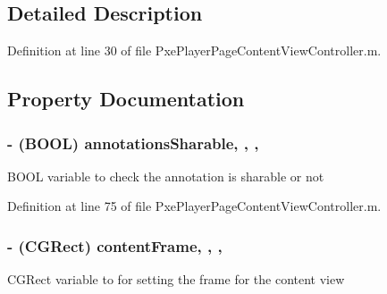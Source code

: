 \subsection{Detailed Description}


Definition at line 30 of file Pxe\-Player\-Page\-Content\-View\-Controller.\-m.



\subsection{Property Documentation}
\hypertarget{category_pxe_player_page_content_view_controller_07_08_aed72d78725a3cab4c50c195b60681fa0}{
\subsubsection[{annotations\-Sharable}]{\setlength{\rightskip}{0pt plus 5cm}-\/ (B\-O\-O\-L) annotations\-Sharable\hspace{0.3cm}{\ttfamily [read]}, {\ttfamily [write]}, {\ttfamily [nonatomic]}, {\ttfamily [assign]}}}\label{category_pxe_player_page_content_view_controller_07_08_aed72d78725a3cab4c50c195b60681fa0}
B\-O\-O\-L variable to check the annotation is sharable or not 

Definition at line 75 of file Pxe\-Player\-Page\-Content\-View\-Controller.\-m.

\hypertarget{category_pxe_player_page_content_view_controller_07_08_a2ad90ffea6617ce2f6ca5d342290ce56}{
\subsubsection[{content\-Frame}]{\setlength{\rightskip}{0pt plus 5cm}-\/ (C\-G\-Rect) content\-Frame\hspace{0.3cm}{\ttfamily [read]}, {\ttfamily [write]}, {\ttfamily [nonatomic]}, {\ttfamily [assign]}}}\label{category_pxe_player_page_content_view_controller_07_08_a2ad90ffea6617ce2f6ca5d342290ce56}
C\-G\-Rect variable to for setting the frame for the content view 

